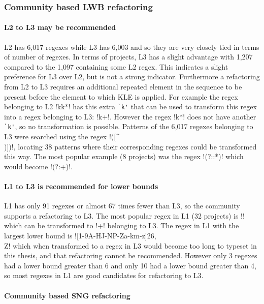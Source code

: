 \subsubsection{Community based LWB refactoring}

\paragraph{L2 to L3 may be recommended} L2 has 6,017 regexes while L3 has 6,003 and so they are very closely tied in terms of number of regexes.  In terms of projects, L3 has a slight advantage with 1,207 compared to the 1,097 containing some L2 regex.  This indicates a slight preference for L3 over L2, but is not a strong indicator.  Furthermore a refactoring from L2 to L3 requires an additional repeated element in the sequence to be present before the element to which KLE is applied.  For example the regex belonging to L2 \cverb!kk*! has this extra \verb!`k'! that can be used to transform this regex into a regex belonging to L3: \cverb!k+!.  However the regex \cverb!k*! does not have another \verb!`k'!, so no transformation is possible.  Patterns of the 6,017 regexes belonging to L3 were searched using the regex \cverb!([^\\)\]])\1\*!, locating 38 patterns where their corresponding regexes could be transformed this way.  The most popular example (8 projects) was the regex \cverb!(?::*)! which would become \cverb!(?:+)!.

\paragraph{L1 to L3 is recommended for lower bounds}  L1 has only 91 regexes or almost 67 times fewer than L3, so the community supports a refactoring to L3.  The most popular regex in L1 (32 projects) is \cverb!! which can be transformed to \cverb!\n\n+! belonging to L3.  The regex in L1 with the largest lower bound is \cverb![1-9A-HJ-NP-Za-km-z]{26,}\\Z! which when transformed to a regex in L3 would become too long to typeset in this thesis, and that refactoring cannot be recommended.  However only 3 regexes had a lower bound greater than 6 and only 10 had a lower bound greater than 4, so most regexes in L1 are good candidates for refactoring to L3.

\paragraph{Community based SNG refactoring}
